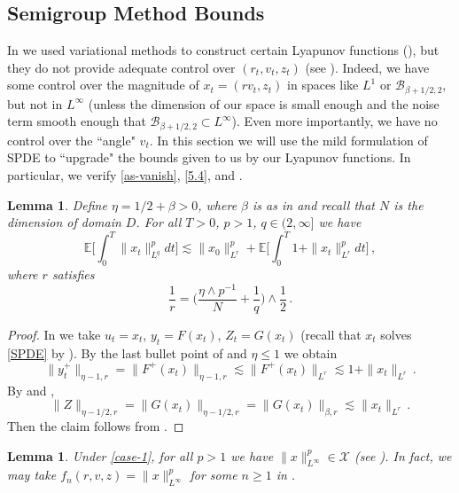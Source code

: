 \documentclass[final]{amsart}
\newtheorem{lem}[thm]{Lemma}
\numberwithin{thm}{section}
\numberwithin{equation}{section}
\newcommand{\E}{\mathbb{E}}
\newcommand{\B}{\mathcal{B}}
\newcommand{\X}{\mathcal{X}}
\begin{document}
\subsection{Semigroup Method Bounds}\label{sec:SPDE-semigrp-method}
In  we used variational methods to construct certain Lyapunov functions (), but they do not provide adequate control over $(r_t,v_t,z_t)$ (see ). Indeed, we have some control over the magnitude of $x_t = (rv_t,z_t)$ in spaces like $L^1$ or $\B_{\beta+1/2,2}$, but not in $L^\infty$ (unless the dimension of our space is small enough and the noise term smooth enough that $\B_{\beta+1/2,2} \subset L^\infty$). Even more importantly, we have no control over the ``angle" $v_t$. In this section we will use the mild formulation of SPDE to ``upgrade" the bounds given to us by our Lyapunov functions. In particular, we verify \ref{as-vanish}, \ref{5.4}, and .



\begin{lem}\label{lem:bootstrap-inductive-step}
    Define $\eta = 1/2 + \beta > 0$, where $\beta$ is as in   and recall that $N$ is the dimension of domain $D$. For all $T > 0$, $p > 1$, $q \in (2,\infty]$ we have
    $$\E\Big[\int_0^T \|x_t\|_{L^q}^pdt\Big] \lesssim \|x_0\|_{L^r}^p + \E\Big[\int_0^T 1+\|x_t\|_{L^r}^pdt\Big] \,,$$
    where $r$ satisfies
    $$\frac{1}{r} = \Big(\frac{\eta \wedge p^{-1}}{N} + \frac{1}{q}\Big) \wedge \frac{1}{2} \,.$$
\end{lem}

\begin{proof}
    In  we take $u_t = x_t$, $y_t = F(x_t)$, $Z_t = G(x_t)$ (recall that $x_t$ solves \eqref{SPDE} by ). By the last bullet point of  and $\eta \leq 1$ we obtain
    $$\|y^+_t\|_{\eta-1,r} = \|F^+(x_t)\|_{\eta-1,r} \lesssim \|F^+(x_t)\|_{L^r} \lesssim 1+\|x_t\|_{L^r} \,.$$
    By  and ,
    $$\|Z\|_{\eta-1/2,r} = \|G(x_t)\|_{\eta-1/2,r} = \|G(x_t)\|_{\beta,r} \lesssim \|x_t\|_{L^r} \,.$$
    Then the claim follows from .
\end{proof}

\begin{lem}\label{lem:case-1-l-infty-to-p-in-X}
    Under \ref{case-1}, for all $p > 1$ we have $\|x\|_{L^\infty}^p \in \X$ (see ). In fact, we may take $f_n(r,v,z) = \|x\|_{L^\infty}^p$ for some $n \geq 1$ in .
\end{lem}
\end{document}

